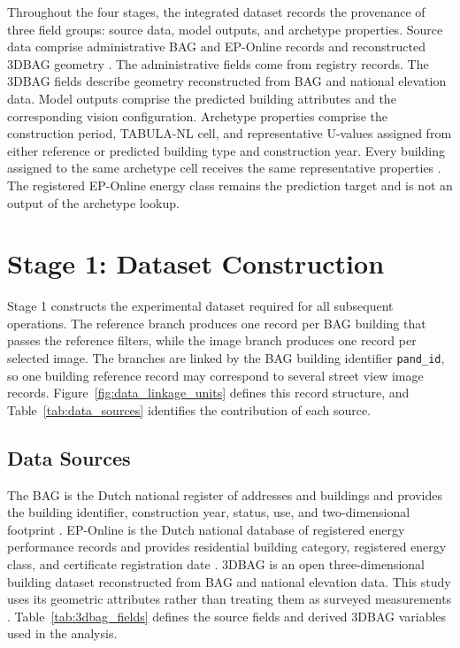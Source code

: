 Throughout the four stages, the integrated dataset records the provenance of three field groups: source data, model outputs, and archetype properties.
Source data comprise administrative \acf{BAG} and EP-Online records and reconstructed 3DBAG geometry \parencite{kadasterbag,rvoeponline,threedbagdocs,peters2022,dukai2021}.
The administrative fields come from registry records. The 3DBAG fields describe geometry reconstructed from BAG and national elevation data.
Model outputs comprise the predicted building attributes and the corresponding vision configuration.
Archetype properties comprise the construction period, TABULA-NL cell, and representative U-values assigned from either reference or predicted building type and construction year.
Every building assigned to the same archetype cell receives the same representative properties \parencite{loga2016,tabulawebtool}.
The registered EP-Online energy class remains the prediction target and is not an output of the archetype lookup.

\section{Stage 1: Dataset Construction}
\label{sec:dataset_construction}

Stage 1 constructs the experimental dataset required for all subsequent operations.
The reference branch produces one record per BAG building that passes the reference filters, while the image branch produces one record per selected image.
The branches are linked by the BAG building identifier \texttt{pand\_id}, so one building reference record may correspond to several street view image records.
Figure~\ref{fig:data_linkage_units} defines this record structure, and Table~\ref{tab:data_sources} identifies the contribution of each source.

\subsection{Data Sources}
\label{sec:data_sources}

The \acf{BAG} is the Dutch national register of addresses and buildings and provides the building identifier, construction year, status, use, and two-dimensional footprint \parencite{kadasterbag}.
EP-Online is the Dutch national database of registered energy performance records and provides residential building category, registered energy class, and certificate registration date \parencite{rvoeponline}.
3DBAG is an open three-dimensional building dataset reconstructed from BAG and national elevation data.
This study uses its geometric attributes rather than treating them as surveyed measurements \parencite{threedbagdocs,peters2022,dukai2021}.
Table~\ref{tab:3dbag_fields} defines the source fields and derived 3DBAG variables used in the analysis.


